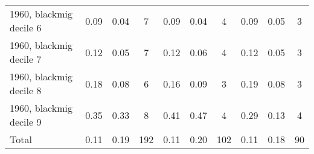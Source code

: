 \begin{table}[htbp]
\begin{tabular}{l*{3}{ccc}}
1960, blackmig decile 6&        0.09&        0.04&           7&        0.09&        0.04&           4&        0.09&        0.05&           3\\
1960, blackmig decile 7&        0.12&        0.05&           7&        0.12&        0.06&           4&        0.12&        0.05&           3\\
1960, blackmig decile 8&        0.18&        0.08&           6&        0.16&        0.09&           3&        0.19&        0.08&           3\\
1960, blackmig decile 9&        0.35&        0.33&           8&        0.41&        0.47&           4&        0.29&        0.13&           4\\
Total               &        0.11&        0.19&         192&        0.11&        0.20&         102&        0.11&        0.18&          90\\
\bottomrule
\end{tabular}
\end{table}
